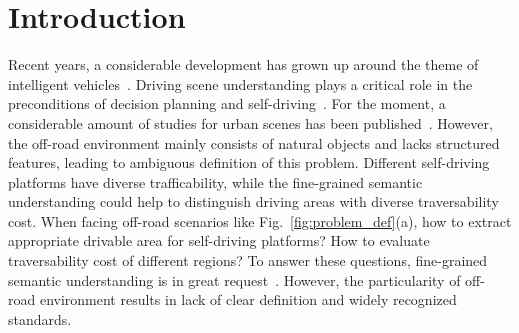 \documentclass[letterpaper, 10 pt, conference]{ieeeconf}  %
\begin{document}
\section{Introduction}
Recent years, a considerable development has grown up around the theme of intelligent vehicles~\cite{feng2020deep}. Driving scene understanding plays a critical role in the preconditions of decision planning and self-driving~\cite{badue2020self}. For the moment, a considerable amount of studies for urban scenes has been published~\cite{siam2017deep}. However, the off-road environment mainly consists of natural objects and lacks structured features, leading to ambiguous definition of this problem.
Different self-driving platforms have diverse trafficability, while the fine-grained semantic understanding could help to distinguish driving areas with diverse traversability cost. When facing off-road scenarios like Fig.~\ref{fig:problem_def}(a), how to extract appropriate drivable area for self-driving platforms? How to evaluate traversability cost of different regions? To answer these questions, fine-grained semantic understanding is in great request~\cite{wellhausen2019should}. However, the particularity of off-road environment results in lack of clear definition and widely recognized standards.

\end{document}
